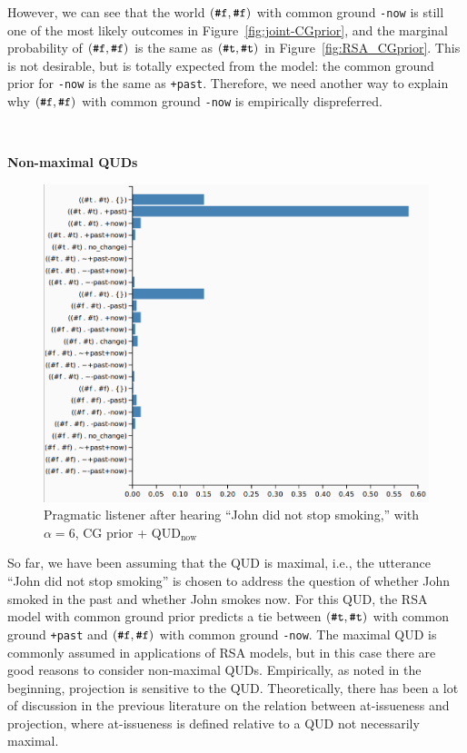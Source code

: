 However, we can see that the world $(\verb+#f+, \verb+#f+)$ 
 with common ground \verb=-now= 
 is still one of the most likely outcomes in Figure~\ref{fig:joint-CGprior}, and the marginal
 probability of $(\verb+#f+, \verb+#f+)$ is the same as $(\verb+#t+, \verb+#t+)$ in Figure~\ref{fig:RSA_CGprior}.
This is not desirable, but is totally expected from the model: the common ground prior for \verb=-now= is the same as 
 \verb=+past=.
Therefore, we need another way to explain why $(\verb+#f+, \verb+#f+)$ 
 with common ground \verb=-now= is empirically dispreferred.


\ 

\noindent\textbf{Non-maximal QUDs}

\begin{figure}
 \includegraphics[scale=0.26]{figs/alpha6CGprior_QUDnow.png}%
 \caption{Pragmatic listener after hearing ``John did not stop smoking,'' with $\alpha=6$, CG prior + QUD$_\text{now}$\label{fig:joint-QUDnow}}
\end{figure}

So far, we have been assuming that the QUD is maximal, i.e., the utterance 
 ``John did not stop smoking'' is chosen to address the question of
 whether John smoked in the past and whether John smokes now.
For this QUD, the RSA model with common ground prior predicts a tie between 
 $(\verb+#t+, \verb+#t+)$ with common ground \verb=+past= and
 $(\verb+#f+, \verb+#f+)$ with common ground \verb=-now=.
The maximal QUD is commonly assumed in applications of RSA models, but 
 in this case there are good reasons to consider non-maximal QUDs.
Empirically, as noted in the beginning, projection is sensitive to the QUD.
Theoretically, there has been a lot of discussion in the previous literature
 \cite{Beaver2010:Have-You-Noticed, SimonsEtAl2001:What-Projects-and-Why} on the relation between at-issueness and projection, where at-issueness is defined 
 relative to a QUD not necessarily maximal.
 
